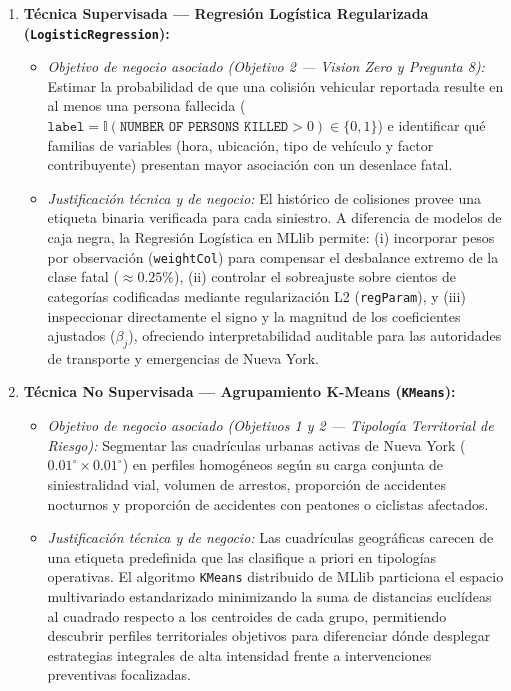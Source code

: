 \begin{enumerate}
    \item \textbf{Técnica Supervisada --- Regresión Logística Regularizada (\texttt{LogisticRegression}):}
    \begin{itemize}
        \item \textit{Objetivo de negocio asociado (Objetivo 2 --- Vision Zero y Pregunta 8):} Estimar la probabilidad de que una colisión vehicular reportada resulte en al menos una persona fallecida ($\texttt{label} = \mathbb{I}(\texttt{NUMBER OF PERSONS KILLED} > 0) \in \{0, 1\}$) e identificar qué familias de variables (hora, ubicación, tipo de vehículo y factor contribuyente) presentan mayor asociación con un desenlace fatal.
        \item \textit{Justificación técnica y de negocio:} El histórico de colisiones provee una etiqueta binaria verificada para cada siniestro. A diferencia de modelos de caja negra, la Regresión Logística en MLlib permite: (i) incorporar pesos por observación (\texttt{weightCol}) para compensar el desbalance extremo de la clase fatal ($\approx 0.25\%$), (ii) controlar el sobreajuste sobre cientos de categorías codificadas mediante regularización L2 (\texttt{regParam}), y (iii) inspeccionar directamente el signo y la magnitud de los coeficientes ajustados ($\beta_j$), ofreciendo interpretabilidad auditable para las autoridades de transporte y emergencias de Nueva York.
    \end{itemize}

    \item \textbf{Técnica No Supervisada --- Agrupamiento K-Means (\texttt{KMeans}):}
    \begin{itemize}
        \item \textit{Objetivo de negocio asociado (Objetivos 1 y 2 --- Tipología Territorial de Riesgo):} Segmentar las cuadrículas urbanas activas de Nueva York ($0.01^\circ \times 0.01^\circ$) en perfiles homogéneos según su carga conjunta de siniestralidad vial, volumen de arrestos, proporción de accidentes nocturnos y proporción de accidentes con peatones o ciclistas afectados.
        \item \textit{Justificación técnica y de negocio:} Las cuadrículas geográficas carecen de una etiqueta predefinida que las clasifique a priori en tipologías operativas. El algoritmo \texttt{KMeans} distribuido de MLlib particiona el espacio multivariado estandarizado minimizando la suma de distancias euclídeas al cuadrado respecto a los centroides de cada grupo, permitiendo descubrir perfiles territoriales objetivos para diferenciar dónde desplegar estrategias integrales de alta intensidad frente a intervenciones preventivas focalizadas.
    \end{itemize}
\end{enumerate}

